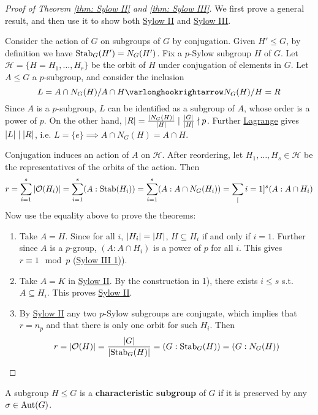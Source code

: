 \begin{proof}[Proof of Theorem \ref{thm: Sylow II} and \ref{thm: Sylow III}]
    We first prove a general result, and then use it to show both \hyperref[thm: Sylow II]{Sylow II} and \hyperref[thm: Sylow III]{Sylow III}.

    Consider the action of $G$ on subgroups of $G$ by conjugation. Given $H' \leq G$, by definition we have $\mathrm{Stab}_G(H') = N_G(H')$. Fix a $p$-Sylow subgroup $H$ of $G$. Let $\mathcal{H} = \{H = H_1, \dots, H_r\}$ be the orbit of $H$ under conjugation of elements in $G$. Let $A \leq G$ a $p$-subgroup, and consider the inclusion
    \[
        L = A\cap N_G(H)/A \cap H \ext N_G(H)/H = R
    \]
    Since $A$ is a $p$-subgroup, $L$ can be identified as a subgroup of $A$, whose order is a power of $p$. On the other hand, $\left|R\right| = \frac{\left|N_G(H)\right|}{\left|H\right|} \mid \frac{\left|G\right|}{\left|H\right|} \nmid p$. Further \hyperref[thm: Lagrange]{Lagrange} gives $\left|L\right| \mid \left|R\right|$, i.e. $L = \{e\} \implies A \cap N_G(H) = A \cap H$.

    Conjugation induces an action of $A$ on $\mathcal{H}$. After reordering, let $H_1, \dots, H_s \in \mathcal{H}$ be the representatives of the orbits of the action. Then
    \[
        r = \sum_{i = 1}^s \left|\mathcal{O}(H_i)\right| = \sum_{i = 1}^s (A : \mathrm{Stab}(H_i)) = \sum_{i = 1}^s (A : A \cap N_G(H_i)) = \sum_[i = 1]^s (A : A \cap H_i)
    \]
    Now use the equality above to prove the theorems:
    \begin{enumerate}[label=\arabic*)]
        \item Take $A = H$. Since for all $i$, $\left|H_i\right| = \left|H\right|$, $H \subseteq H_i$ if and only if $i = 1$. Further since $A$ is a $p$-group, $(A : A \cap H_i)$ is a power of $p$ for all $i$. This gives $r \equiv 1 \mod{p}$ (\hyperref[thm: Sylow III]{Sylow III 1)}).
        \item Take $A = K$ in \hyperref[thm: Sylow II]{Sylow II}. By the construction in 1), there exists $i \leq s$ s.t. $A \subseteq H_i$. This proves \hyperref[thm: Sylow II]{Sylow II}.
        \item By \hyperref[thm: Sylow II]{Sylow II} any two $p$-Sylow subgroups are conjugate, which implies that $r = n_p$ and that there is only one orbit for such $H_i$. Then
        \[
            r = \left|\mathcal{O}(H)\right| = \frac{\left|G\right|}{\left|\mathrm{Stab}_G(H)\right|} = (G : \mathrm{Stab}_G(H)) = (G : N_G(H))
        \]
    \end{enumerate}
\end{proof}

\begin{definition}
    A subgroup $H \leq G$ is a \textbf{characteristic subgroup} of $G$ if it is preserved by any $\sigma \in \mathrm{Aut}(G)$.
\end{definition}


